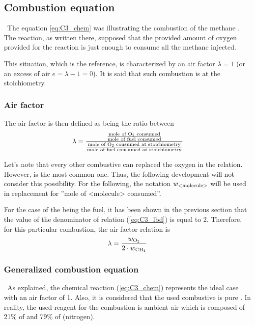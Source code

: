\subsection{Combustion equation}
\quad\ The equation \ref{eq:C3_chem} was illustrating the combustion of the methane . The reaction, as written there, supposed that the provided amount of oxygen provided for the reaction is just enough to consume all the methane injected.

This situation, which is the reference, is characterized by an air factor \(\lambda = 1\) (or an excess of air \(e=\lambda-1=0\)). It is said that such combustion is at the stoichiometry.

\subsubsection{Air factor}
The air factor is then defined as being the ratio between
\begin{equation}
    \lambda = \frac{\frac{\text{mole of \ce{O2} consumed}}{\text{mole of fuel consumed}}}{\frac{\text{mole of \ce{O2} consumed at stoichiometry}}{\text{mole of fuel consumed at stoichiometry}}} \label{eq:C3_lbd}
\end{equation}

Let's note that every other combustive can replaced the oxygen in the relation. However,  is the most common one. Thus, the following development will not consider this possibility.
For the following, the notation \(w_{\ce{\text{<molecule>}}}\) will be used in replacement for ''mole of <molecule> consumed''.

For the case of the  being the fuel, it has been shown in the previous section that the value of the denominator of relation (\ref{eq:C3_lbd}) is equal to 2. Therefore, for this particular combustion, the air factor relation is
\begin{equation}
    \lambda = \frac{w_{\ce{O2}}}{2\cdot w_{\ce{CH4}}}\label{eq:C3_lbdCH4}
\end{equation}

\subsubsection{Generalized combustion equation}
\quad\ As explained, the chemical reaction (\ref{eq:C3_chem}) represents the ideal case with an air factor of 1. Also, it is considered that the used combustive is pure . In reality, the used reagent for the combustion is ambient air which is composed of 21\% of  and 79\% of  (nitrogen).

